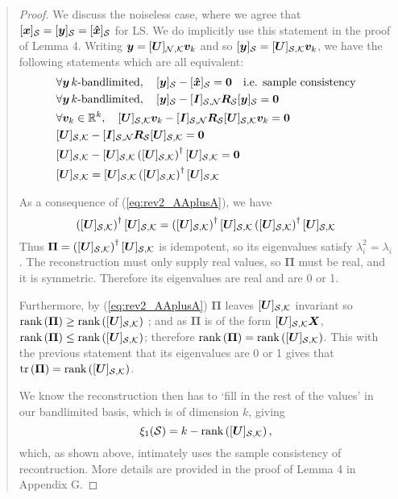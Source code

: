 \documentclass[11pt,onecolumn,journal]{IEEEtran}
\newcommand{\matr}[1]{\bm{#1}}
\newcommand{\vect}[1]{\bm{#1}}
\theoremstyle{definition}
\newcommand{\set}[1]{\mathcal{#1}}
\newcommand{\trace}[1]{\textrm{tr}\left(#1\right)}
\newcommand{\rank}[1]{\textrm{rank}\left(#1\right)}
\newcommand{\matrsubU}[1]{\matrsub[#1, K]{U}}
\begin{document}
\begin{quote}
\begin{proof}
We discuss the noiseless case, where we agree that $\vectsub[S]{x} = \vectsub[S]{y} = \vectsub[S]{\hat{\vect{x}}}$ for LS. We do implicitly use this statement in the proof of Lemma 4. Writing $\vect{y} = \matrsubU{N}\vect{v}_{k}$ and so $\vectsub[S]{y} = \matrsubU{S}\vect{v}_{k}$, we have the following statements which are all equivalent:
\begin{align}
    &\forall \vect{y}\,  k\text{-bandlimited}, \quad \vectsub[S]{y} - \vectsub[S]{\hat{x}} = \vect{0} \quad\text{i.e. sample consistency}\\
    &\forall \vect{y}\,  k\text{-bandlimited}, \quad \vectsub[S]{y} - \matrsub[S,N]{I}\matr{R}_{\set{S}}\vectsub[S]{y} = \vect{0}\\
    &\forall \vect{v}_{k}\in\mathbb{R}^{k}, \quad \matrsubU{S}\vect{v}_{k} - \matrsub[S,N]{I}\matr{R}_{\set{S}}\matrsubU{S}\vect{v}_{k} = \vect{0} \\
    &\matrsubU{S} - \matrsub[S,N]{I}\matr{R}_{\set{S}}\matrsubU{S} = \vect{0}\\
    &\matrsubU{S} - \matrsubU{S}\left(\matrsubU{S}\right)^{\dagger}\matrsubU{S} = \vect{0} \\
    &\matrsubU{S} = \matrsubU{S}\left(\matrsubU{S}\right)^{\dagger}\matrsubU{S}  \label{eq:rev2_AAplusA}
\end{align}

As a consequence of (\ref{eq:rev2_AAplusA}), we have
\begin{equation}
    \left(\matrsubU{S}\right)^{\dagger}\matrsubU{S} = \left(\matrsubU{S}\right)^{\dagger}\matrsubU{S}\left(\matrsubU{S}\right)^{\dagger}\matrsubU{S} 
\end{equation}
Thus $\matr{\Pi} = \left(\matrsubU{S}\right)^{\dagger}\matrsubU{S}$ is idempotent, so its eigenvalues satisfy $\lambda_{i}^{2} = \lambda_{i}$. The reconstruction must only supply real values, so $\matr{\Pi}$ must be real, and it is symmetric. Therefore its eigenvalues are real and are 0 or 1.

Furthermore, by (\ref{eq:rev2_AAplusA}) $\matr{\Pi}$ leaves $\matrsubU{S}$ invariant so $\rank{\matr{\Pi}} \geq \rank{\matrsubU{S}}$ ; and as $\matr{\Pi}$ is of the form $\matrsubU{S}\matr{X}$, $\rank{\matr{\Pi}} \leq \rank{\matrsubU{S}}$; therefore  $\rank{\matr{\Pi}} = \rank{\matrsubU{S}}$. This with the previous statement that its eigenvalues are 0 or 1 gives that $\trace{\matr{\Pi}} = \rank{\matrsubU{S}}$.

We know the reconstruction then has to `fill in the rest of the values' in our bandlimited basis, which is of dimension $k$, giving
\begin{equation}
    \xi_{1}(\set{S}) = k - \rank{\matrsubU{S}},
\end{equation}
which, as shown above, intimately uses the sample consistency of recontruction. More details are provided in the proof of Lemma 4 in Appendix G.


\end{proof}
\end{quote}
\end{document}
